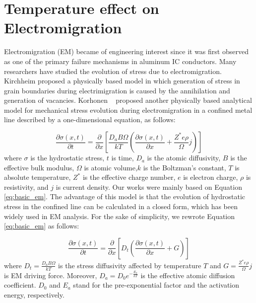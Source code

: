 \section{Temperature effect on Electromigration}
\label{sec:temperature_effect}

Electromigration (EM) became of engineering interest since it was first observed as one of the primary failure mechanisms in aluminum IC conductors. Many researchers have studied the evolution of stress due to electromigration. Kirchheim proposed a physically based model in which generation of stress in grain boundaries during electrimigration is caused by the annihilation and generation of vacancies. Korhonen ~\cite{Korhonen:jap1993} proposed another physically based analytical model for mechanical stress evolution during electromigration in a confined metal line described by a one-dimensional equation, as follows:

\begin{equation}
\label{eq:basic_em}
\frac{\partial \sigma(x,t)}{\partial t}=\frac{\partial }{\partial x}\left[\frac{D_aB\Omega}{kT}\left(\frac{\partial \sigma(x,t)}{\partial x}+\frac{Z^*e\rho}{\Omega}j\right)\right]
\end{equation}
where $\sigma$ is the hydrostatic stress, $t$ is time, $D_a$ is the atomic diffusivity, $B$ is the effective bulk modulus, $\Omega$ is atomic volume,$k$ is the Boltzman's constant, $T$ is absolute temperature, $Z^*$ is the effective charge number, $e$ is electron charge, $\rho$ is resistivity, and $j$ is current density. Our works were mainly based on Equation
\eqref{eq:basic_em}. The advantage of this model is that the evolution of hydrostatic stress in the confined line can be calculated in a closed form, which has been widely used in EM analysis. For the sake of simplicity, we rewrote Equation \eqref{eq:basic_em} as follows:

\begin{equation}
\label{eq:basic_em_s}
\frac{\partial \sigma(x,t)}{\partial t}=\frac{\partial }{\partial x}\left[D_t\left(\frac{\partial \sigma(x,t)}{\partial x}+G\right)\right]
\end{equation}
where $D_t=\frac{D_aB\Omega}{kT}$ is the stress diffusivity affected by temperature $T$ and $G=\frac{Z^*e\rho}{\Omega}j$ is EM driving force. Moreover, $D_a=D_0e^{-\frac{E_a}{kT}}$ is the effective atomic diffusion coefficient. $D_0$ and $E_a$ stand for the pre-exponential factor and the activation energy, respectively.

